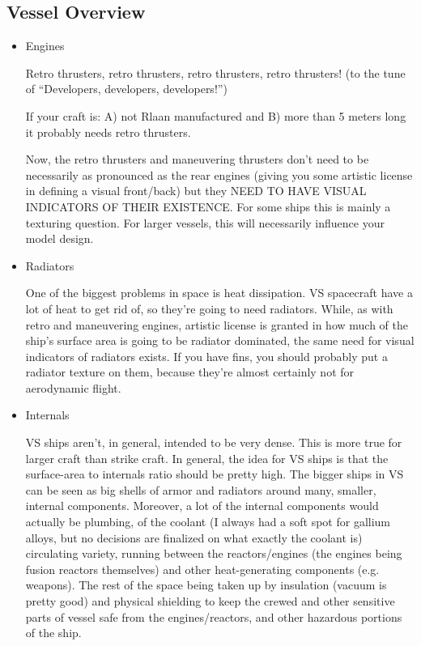 \subsection{Vessel Overview}
\begin{itemize}
\item Engines

Retro thrusters, retro thrusters, retro thrusters, retro thrusters!
(to the tune of ``Developers, developers, developers!'')

If your craft is: A) not Rlaan manufactured and B) more than 5 meters
long it probably needs retro thrusters.

Now, the retro thrusters and maneuvering thrusters don't need to be
necessarily as pronounced as the rear engines (giving you some
artistic license in defining a visual front/back) but they NEED TO
HAVE VISUAL INDICATORS OF THEIR EXISTENCE. For some ships this is
mainly a texturing question. For larger vessels, this will necessarily
influence your model design.  

\item Radiators

One of the biggest problems in space is heat dissipation. VS
spacecraft have a lot of heat to get rid of, so they're going to need
radiators. While, as with retro and maneuvering engines, artistic
license is granted in how much of the ship's surface area is going to
be radiator dominated, the same need for visual indicators of
radiators exists. If you have fins, you should probably put a radiator
texture on them, because they're almost certainly not for aerodynamic
flight.  

\item Internals

VS ships aren't, in general, intended to be very dense. This is more
true for larger craft than strike craft. In general, the idea for VS
ships is that the surface-area to internals ratio should be pretty
high. The bigger ships in VS can be seen as big shells of armor and
radiators around many, smaller, internal components. Moreover, a lot
of the internal components would actually be plumbing, of the coolant
(I always had a soft spot for gallium alloys, but no decisions are
finalized on what exactly the coolant is) circulating variety, running
between the reactors/engines (the engines being fusion reactors
themselves) and other heat-generating components (e.g. weapons). The
rest of the space being taken up by insulation (vacuum is pretty good)
and physical shielding to keep the crewed and other sensitive parts of
vessel safe from the engines/reactors, and other hazardous portions of
the ship.  


\end{itemize}
